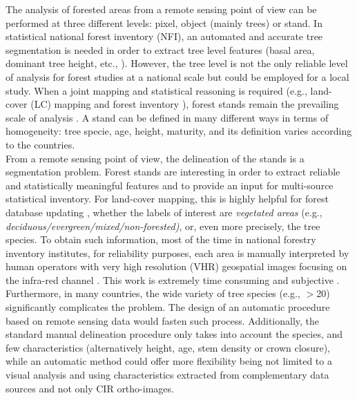 The analysis of forested areas from a remote sensing point of view can be performed at three different levels: pixel, object (mainly trees) or stand. In statistical national forest inventory (NFI), an automated and accurate tree segmentation is needed in order to extract tree level features (basal area, dominant tree height, etc., \citep{means2000predicting,Malatamo}). However, the tree level is not the only reliable level of analysis for forest studies at a national scale but could be employed for a local study. When a joint mapping and statistical reasoning is required (e.g., land-cover (LC) mapping and forest inventory \citep{tomppo2008combining}), forest stands remain the prevailing scale of analysis \citep{means2000predicting,White2016CJRS}. A stand can be defined in many different ways in terms of homogeneity: tree specie, age, height, maturity, and its definition varies according to the countries. \\

From a remote sensing point of view, the delineation of the stands is a segmentation problem. Forest stands are interesting in order to extract reliable and statistically meaningful features and to provide an input for multi-source statistical inventory. For land-cover mapping, this is highly helpful for forest database updating \citep{Kim09}, whether the labels of interest are \textit{vegetated areas} {(e.g., \textit{deciduous/evergreen/mixed/non-forested)}}, or, even more precisely, the tree species. To obtain such information, most of the time in national forestry inventory institutes, for reliability purposes, each area is manually interpreted by human operators with very high resolution (VHR) geospatial images focusing on the infra-red channel \citep{Malatamo}. This work is extremely time consuming and subjective \citep{Wulder2008}. Furthermore, in many countries, the wide variety of tree species (e.g., $>$20) significantly complicates the problem. The design of an automatic procedure based on remote sensing data would fasten such process. Additionally, the standard manual delineation procedure only takes into account the species, and few characteristics (alternatively height, age, stem density or crown closure), while an automatic method could offer more flexibility being not limited to a visual analysis and using characteristics extracted from complementary data sources and not only CIR ortho-images. \\

